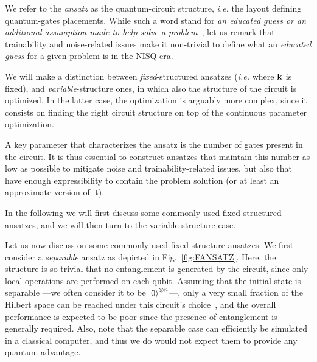 We refer to the \textit{ansatz} as the quantum-circuit structure, \textit{i.e.} the layout defining quantum-gates placements. While such a word stand for \textit{an educated guess or an additional assumption made to help solve a problem}~\cite{wikiansa}, let us remark that trainability and noise-related issues make it non-trivial to define what an \textit{educated guess} for a given problem is in the NISQ-era.

We will make a distinction between \textit{fixed}-structured ansatzes (\textit{i.e.} where $\mathbf{k}$ is fixed), and \textit{variable}-structure ones, in which also the structure of the circuit is optimized. In the latter case, the optimization is arguably more complex, since it consists on finding the right circuit structure on top of the continuous parameter optimization.

A key parameter that characterizes the ansatz is the number of gates present in the circuit. It is thus essential to construct ansatzes that maintain this number as low as possible to mitigate noise and trainability-related issues, but also that have enough expressibility to contain the problem solution (or at least an approximate version of it).

In the following we will first discuss some commonly-used fixed-structured ansatzes, and we will then turn to the variable-structure case.

\vspace{1cm}

Let us now discuss on some commonly-used fixed-structure ansatzes. We first consider a \textit{separable} ansatz as depicted in Fig.~\ref{fig:FANSATZ}. Here, the structure is so trivial that no entanglement is generated by the circuit, since only local operations are performed on each qubit. Assuming that the initial state is separable ---we often consider it to be $\ket{0}^{\otimes n}$---, only a very small fraction of the Hilbert space can be reached under this circuit's choice~\cite{separableAnna}, and the overall performance is expected to be poor since the presence of entanglement is generally required. Also, note that the separable case can efficiently be simulated in a classical computer, and thus we do would not expect them to provide any quantum advantage.

